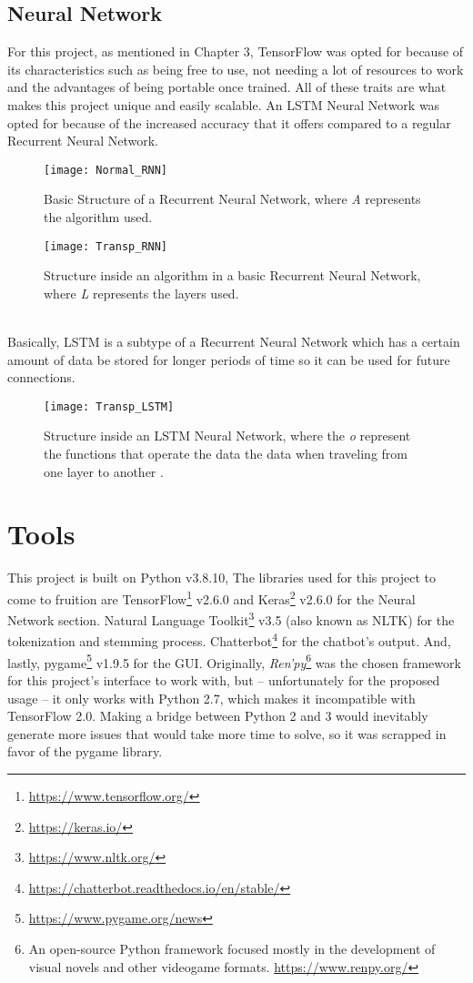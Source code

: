 \subsection{Neural Network}
For this project, as mentioned in Chapter 3, TensorFlow was opted for because of its characteristics such as being free to use, not needing a lot of resources to work and the advantages of being portable once trained. All of these traits are what makes this project unique and easily scalable.
An LSTM Neural Network was opted for because of the increased accuracy that it offers compared to a regular Recurrent Neural Network.
\begin{figure}[!b]
	\centering
	\texttt{[image: Normal\_RNN]}
	\caption{Basic Structure of a Recurrent Neural Network, where \textit{A} represents the algorithm used.}
	\label{fig:neuraldiagram_1}
\end{figure}
\begin{figure}[!bht]
	\centering
	\texttt{[image: Transp\_RNN]}
	\caption{Structure inside an algorithm in a basic Recurrent Neural Network, where \textit{L} represents the layers used.}
	\label{fig:neuraldiagram_2}
\end{figure}
\\
\indent Basically, LSTM is a subtype of a Recurrent Neural Network which has a certain amount of data be stored for longer periods of time so it can be used for future connections.
\begin{figure}[!bht]
	\centering
	\texttt{[image: Transp\_LSTM]}
	\caption{Structure inside an LSTM Neural Network, where the \textit{o} represent the functions that operate the data the data when traveling from one layer to another \citep{rf21}.}
	\label{fig:neuraldiagram_3}
\end{figure}
\pagebreak
\section{Tools}
This project is built on Python v3.8.10, The libraries used for this project to come to fruition are TensorFlow\footnote{\url{https://www.tensorflow.org/}} v2.6.0 and Keras\footnote{\url{https://keras.io/}} v2.6.0 for the Neural Network section. Natural Language Toolkit\footnote{\url{https://www.nltk.org/}} v3.5 (also known as NLTK) for the tokenization and stemming process. Chatterbot\footnote{\url{https://chatterbot.readthedocs.io/en/stable/}} for the chatbot's output. And, lastly, pygame\footnote{\url{https://www.pygame.org/news}} v1.9.5 for the GUI.
Originally, \textit{Ren'py}\footnote{An open-source Python framework focused mostly in the development of visual novels and other videogame formats. \url{https://www.renpy.org/}} was the chosen framework for this project's interface to work with, but -- unfortunately for the proposed usage -- it only works with Python 2.7, which makes it incompatible with TensorFlow 2.0. Making a bridge between Python 2 and 3 would inevitably generate more issues that would take more time to solve, so it was scrapped in favor of the pygame library.

